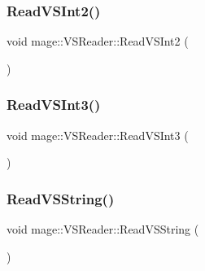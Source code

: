 \hypertarget{classmage_1_1_v_s_reader_a4a3b90b47cb5e262a72df719674b9d93}{}\label{classmage_1_1_v_s_reader_a4a3b90b47cb5e262a72df719674b9d93} 
\subsubsection{\texorpdfstring{Read\+V\+S\+Int2()}{ReadVSInt2()}}
{\footnotesize\ttfamily void mage\+::\+V\+S\+Reader\+::\+Read\+V\+S\+Int2 (\begin{DoxyParamCaption}{ }\end{DoxyParamCaption})\hspace{0.3cm}{\ttfamily [private]}}

\hypertarget{classmage_1_1_v_s_reader_a6fa8fa2cbb66a9a1872bb84a0612a32d}{}\label{classmage_1_1_v_s_reader_a6fa8fa2cbb66a9a1872bb84a0612a32d} 
\subsubsection{\texorpdfstring{Read\+V\+S\+Int3()}{ReadVSInt3()}}
{\footnotesize\ttfamily void mage\+::\+V\+S\+Reader\+::\+Read\+V\+S\+Int3 (\begin{DoxyParamCaption}{ }\end{DoxyParamCaption})\hspace{0.3cm}{\ttfamily [private]}}

\hypertarget{classmage_1_1_v_s_reader_a8d00057f90b2a2ed2e84e47530f91227}{}\label{classmage_1_1_v_s_reader_a8d00057f90b2a2ed2e84e47530f91227} 
\subsubsection{\texorpdfstring{Read\+V\+S\+String()}{ReadVSString()}}
{\footnotesize\ttfamily void mage\+::\+V\+S\+Reader\+::\+Read\+V\+S\+String (\begin{DoxyParamCaption}{ }\end{DoxyParamCaption})\hspace{0.3cm}{\ttfamily [private]}}

